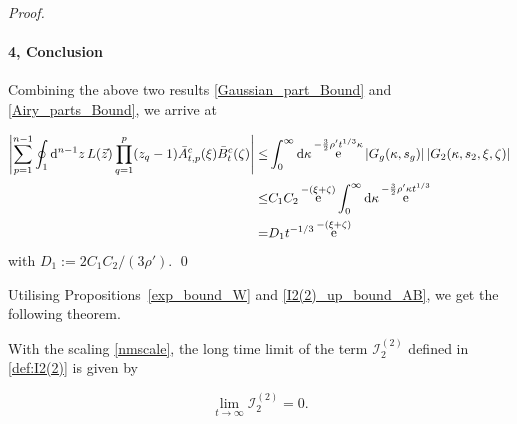 \documentclass[cmp]{svjour}
\numberwithin{theorem}{section}
\numberwithin{equation}{section}
\DeclareMathOperator{\e}{e}
\def\dd{{\rm d}}
\begin{document}
\begin{proof}
\paragraph{4, Conclusion} Combining the above two results \eqref{Gaussian_part_Bound} and \eqref{Airy_parts_Bound}, we arrive at

\begin{equation*}
\begin{split}
\left| \sum_{p=1}^{n-1} \oint_1 \dd^{n-1} z\,  L(\vec{z}) \prod_{q=1}^{p}(z_q-1) \bar{A}^c_{t,p}(\xi) \bar{B}^c_t(\zeta) \right|
\leq &  \int_{0}^{\infty} \dd \kappa \e^{ - \frac{3}{2} \rho' t^{1/3} \kappa } \left| G_g(\kappa, s_g) \right| \left| G_2(\kappa, s_2 , \xi , \zeta) \right| \\
\leq & C_1 C_2 \e^{-(\xi + \zeta)} \int_{0}^{\infty} \dd \kappa \e^{ - \frac{3}{2} \rho' \kappa t^{1/3} } \\
= & D_1 t^{-1/3} \e^{- (\xi + \zeta)}
\end{split}
\end{equation*}
with $D_1 := 2C_1 C_2 / (3 \rho')$.
\qed
\end{proof}

Utilising Propositions~\ref{exp_bound_W} and \ref{I2(2)_up_bound_AB}, we get the following theorem.

\begin{theorem}
\label{thm_I2(2) limit}

With the scaling \eqref{nmscale}, the long time limit of the term $\mathcal{I}_2^{(2)}$ defined in \eqref{def:I2(2)} is given by

\begin{equation}
\label{I2(2) limit}
\lim_{t\rightarrow\infty}\mathcal{I}^{(2)}_2 = 0.
\end{equation}
\end{theorem}
\end{document}
